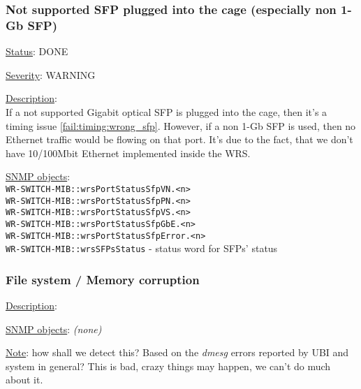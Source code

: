 \subsubsection{\bf Not supported SFP plugged into the cage (especially non 1-Gb SFP)}
		\label{fail:other:sfp}
		\begin{packed_enum}
			\item [] \underline{Status}: DONE
			\item [] \underline{Severity}: WARNING
			\item [] \underline{Description}:\\
				If a not supported Gigabit optical SFP is plugged into the cage, then
				it's a timing issue \ref{fail:timing:wrong_sfp}. However, if a non 1-Gb
				SFP is used, then no Ethernet traffic would be flowing on that port.
				It's due to the fact, that we don't have 10/100Mbit Ethernet implemented
				inside the WRS.
			\item [] \underline{SNMP objects}:\\
				\texttt{WR-SWITCH-MIB::wrsPortStatusSfpVN.<n>}\\
				\texttt{WR-SWITCH-MIB::wrsPortStatusSfpPN.<n>}\\
				\texttt{WR-SWITCH-MIB::wrsPortStatusSfpVS.<n>}\\
				\texttt{WR-SWITCH-MIB::wrsPortStatusSfpGbE.<n>}\\
				\texttt{WR-SWITCH-MIB::wrsPortStatusSfpError.<n>}\\
				\texttt{WR-SWITCH-MIB::wrsSFPsStatus} - status word for SFPs' status
		\end{packed_enum}

\subsubsection{\bf File system / Memory corruption}
		\label{fail:other:memory}
		\begin{packed_enum}
			\item [] \underline{Description}:\\
			\item [] \underline{SNMP objects}: \emph{(none)}
			\item [] \underline{Note}: how shall we detect this? Based on the
				\emph{dmesg} errors reported by UBI and system in general?  This is bad,
				crazy things may happen, we can't do much about it.
		\end{packed_enum}

